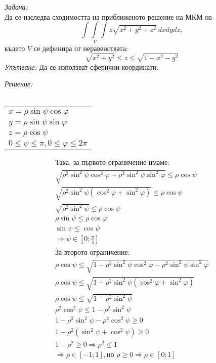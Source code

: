 \documentclass[fleqn,12pt]{article}
\date{25 април 2017}
\begin{document}
\textit{Задача:} \\
Да се изследва сходимостта на приближеното решение на МКМ на
\[
\int \int\limits_V \int z \sqrt{x^2 + y^2 + z^2}\ dxdydz,
\]
където $V$ се дефинира от неравенствата:
\[
\sqrt{x^2 + y^2} \leq z \leq \sqrt{1 - x^2 - y^2}
\]
\textit{Упътване:} Да се използват сферични координати.\\
\par
\textit{Решение:} \\
\\
\begin{tabular}{|l}
$x = \rho \sin \psi \cos \varphi$ \\
$y = \rho \sin \psi \sin \varphi$ \\
$z = \rho \cos \psi$ \\
$0 \leq \psi \leq \pi, 0 \leq \varphi \leq 2\pi$
\end{tabular}

\begin{multline}
\text{Така, за първото ограничение имаме:}\\
\sqrt{\rho^2 \sin^2 \psi \cos^2 \varphi + \rho^2 \sin^2 \psi \sin^2 \varphi} \leq \rho \cos \psi\\
\sqrt{\rho^2 \sin^2 \psi (\cos^2 \varphi + \sin^2 \varphi)} \leq \rho \cos \psi\\
\sqrt{\rho^2 \sin^2 \psi} \leq \rho \cos\psi\\
\rho \sin \psi \leq \rho \cos \varphi\\
\sin \psi \leq \cos \psi\\
\Rightarrow \psi \in [0;\frac{\pi}{4}]\\
\\
\text{За второто ограничение:}\\
\rho \cos \psi \leq \sqrt{1 - \rho^2 \sin^2 \psi \cos^2 \varphi - \rho^2 \sin^2 \psi \sin^2 \varphi}\\
\rho \cos \psi \leq \sqrt{1 - \rho^2 \sin^2 \psi(\cos^2 \varphi + \sin^2 \varphi)}\\
\rho \cos \psi \leq \sqrt{1 - \rho^2 \sin^2 \psi}\\
\rho^2 \cos^2\psi \leq 1 - \rho^2 \sin^2 \psi\\
1 - \rho^2 \sin^2 \psi - \rho^2 \cos^2 \psi \geq 0\\
1 - \rho^2 (\sin^2 \psi + \cos^2 \psi) \geq 0\\
1 - \rho^2 \geq 0 \Rightarrow \rho^2 \leq 1 \\
\Rightarrow \rho \in [-1;1], \text{но } \rho \geq 0 \Rightarrow \rho \in [0;1]\\
\\
\end{multline}
\end{document}
